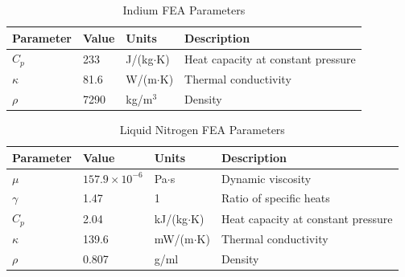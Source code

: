 \documentclass{iucr}
\begin{document}
\begin{table}
\caption{Indium FEA Parameters}
\begin{tabular}{@{}llll@{}}
Parameter    & Value                  & Units                      & Description                        \\
\hline
$C_p$        & 233                    & J/(kg$\cdot$K)               & Heat capacity at constant pressure \\
$\kappa$     & 81.6                   & W/(m$\cdot$K)                & Thermal conductivity               \\
$\rho$       & 7290                   & kg/m$^3$                   & Density                            \\
\end{tabular}
\label{indiumFEA}
\end{table}

\begin{table}
\caption{Liquid Nitrogen FEA Parameters}
\begin{tabular}{@{}llll@{}}
Parameter    & Value                  & Units                       & Description                        \\
\hline
$\mu$        & $157.9\times 10^{-6}$  & Pa$\cdot$s                  & Dynamic viscosity                  \\ 
$\gamma$     & 1.47                   & 1				            & Ratio of specific heats            \\
$C_p$        & 2.04                   & kJ/(kg$\cdot$K)               & Heat capacity at constant pressure \\
$\kappa$     & 139.6                  & mW/(m$\cdot$K)                & Thermal conductivity               \\
$\rho$       & 0.807                  & g/ml                        & Density                            \\
\end{tabular}
\label{nitrogenFEA}
\end{table}
\end{document}
